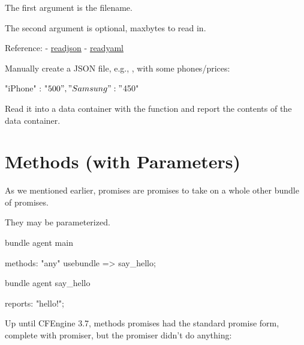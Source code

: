The first argument is the filename.

The second argument is optional, maxbytes to read in.

Reference:
- \href{https://docs.cfengine.com/latest/reference-functions-readjson.html}{readjson}
- \href{https://docs.cfengine.com/latest/reference-functions-readyaml.html}{readyaml}





\begin{aside}
\label{aside:exercise_17}

Manually create a JSON file, e.g., , with some phones/prices:

\begin{code}
{
  "iPhone"  : "$500",
  "Samsung" : "$450"
}
\end{code}

Read it into a data container with the  function and report
the contents of the data container.

\end{aside}





\section{Methods (with Parameters)}

As we mentioned earlier,  promises are promises to take
on a whole other bundle of promises.

They may be parameterized.

\begin{codelisting}
\begin{code}
bundle agent main {

  methods:
      "any"
         usebundle => say_hello;

}

bundle agent say_hello {

reports:  "hello!";

}
\end{code}
\end{codelisting}





Up until CFEngine 3.7, methods promises had the standard promise
form, complete with promiser, but the promiser didn't do anything:

